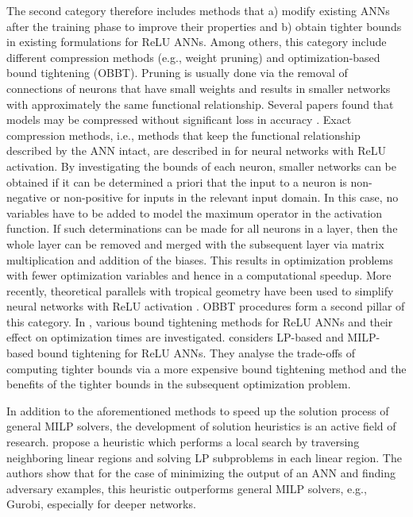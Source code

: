 The second category therefore includes methods that a) modify existing ANNs after the training phase to improve their properties and b) obtain tighter bounds in existing formulations for ReLU ANNs. 
Among others, this category include different compression methods (e.g., weight pruning) and optimization-based bound tightening (OBBT). Pruning is usually done via the removal of connections of neurons that have small weights \citep{Cacciola2024} and results in smaller networks with approximately the same functional relationship. Several papers found that models may be compressed without significant loss in accuracy \citep{Han2015,Suzuki2020a}. Exact compression methods, i.e., methods that keep the functional relationship described by the ANN intact, are described in \citet{Kumar2019,Serra2020} for neural networks with ReLU activation. By investigating the bounds of each neuron, smaller networks can be obtained if it can be determined a priori that the input to a neuron is non-negative or non-positive for inputs in the relevant input domain. In this case, no variables have to be added to model the maximum operator in the activation function. If such determinations can be made for all neurons in a layer, then the whole layer can be removed and merged with the subsequent layer via matrix multiplication and addition of the biases. This results in optimization problems with fewer optimization variables and hence in a computational speedup. More recently, theoretical parallels with tropical geometry have been used to simplify neural networks with ReLU activation \citep{Smyrnis2020}. OBBT procedures form a second pillar of this category. In \citet{Grimstad2019}, various bound tightening methods for ReLU ANNs and their effect on optimization times are investigated. \citet{Badilla2023} considers LP-based and MILP-based bound tightening for ReLU ANNs. They analyse the trade-offs of computing tighter bounds via a more expensive bound tightening method and the benefits of the tighter bounds in the subsequent optimization problem.

In addition to the aforementioned methods to speed up the solution process of general MILP solvers, the development of solution heuristics is an active field of research. \citet{Tong2024} propose a heuristic which performs a local search by traversing neighboring linear regions and solving LP subproblems in each linear region. The authors show that for the case of minimizing the output of an ANN and finding adversary examples, this heuristic outperforms general MILP solvers, e.g., Gurobi, especially for deeper networks.

